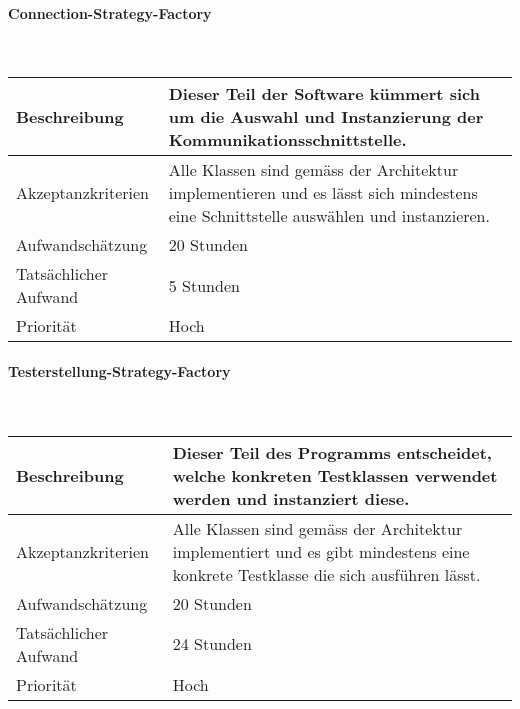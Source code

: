 \documentclass[]{subfiles}
\begin{document}
        \paragraph*{Connection-Strategy-Factory}\mbox{} \\
        \begin{tabularx}{\textwidth}{lX}
            \toprule
            Beschreibung & Dieser Teil der Software kümmert sich um die Auswahl und Instanzierung der Kommunikationsschnittstelle.\\
            \midrule
            Akzeptanzkriterien & Alle Klassen sind gemäss der Architektur implementieren und es lässt sich mindestens eine Schnittstelle auswählen und instanzieren.\\
            \midrule
            Aufwandschätzung & 20 Stunden\\
            Tatsächlicher Aufwand & 5 Stunden\\ 
            \midrule
            Priorität & Hoch\\
            \bottomrule
        \end{tabularx}
    
        \paragraph*{Testerstellung-Strategy-Factory}\mbox{} \\
        \begin{tabularx}{\textwidth}{lX}
            \toprule
            Beschreibung & Dieser Teil des Programms entscheidet, welche konkreten Testklassen verwendet werden und instanziert diese.\\
            \midrule
            Akzeptanzkriterien & Alle Klassen sind gemäss der Architektur implementiert und es gibt mindestens eine konkrete Testklasse die sich ausführen lässt. \\
            \midrule
            Aufwandschätzung & 20 Stunden\\
            Tatsächlicher Aufwand & 24 Stunden\\ 
            \midrule
            Priorität & Hoch\\
            \bottomrule
        \end{tabularx}
        \newpage
    
\end{document}
